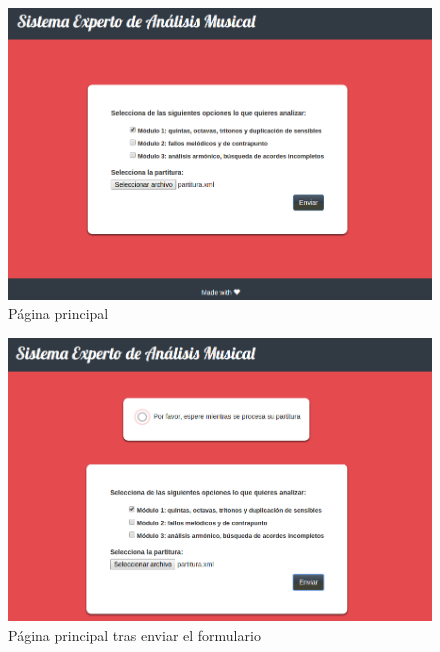 \bigskip

\begin{figure}[H]
	\centering
	\includegraphics[scale=0.35]{imagenes/interfaz3.png}
	\caption{Página principal}
	\label{fig5.3.1}
\end{figure}

\begin{figure}[H]
	\centering
	\includegraphics[scale=0.35]{imagenes/interfaz4.png}
	\caption{Página principal tras enviar el formulario}
	\label{fig5.3.2}
\end{figure}

\bigskip

